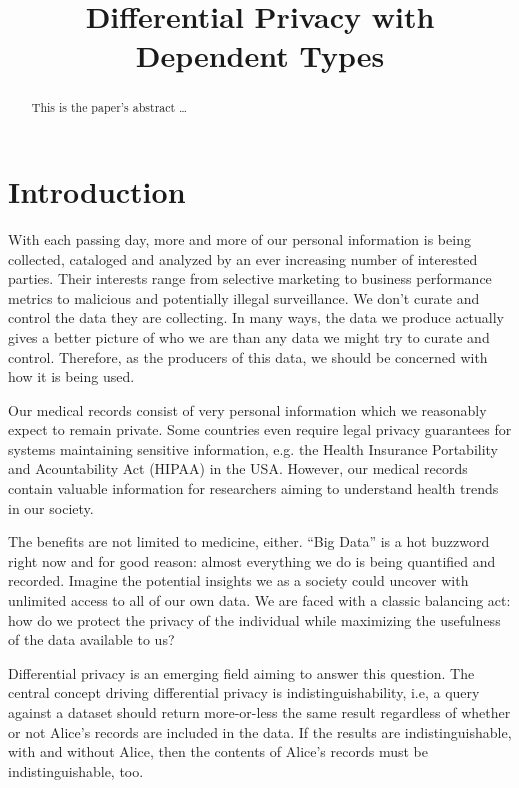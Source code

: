 \documentclass[12pt]{article}
\title{Differential Privacy with Dependent Types}
\begin{document}
\maketitle


\begin{abstract}
This is the paper's abstract \ldots
\end{abstract}


\section{Introduction}\label{sec:introduction}

With each passing day, more and more of our personal information is being collected, cataloged and analyzed by an ever increasing number of interested parties.
Their interests range from selective marketing to business performance metrics to malicious and potentially illegal surveillance.
We don't curate and control the data they are collecting.
In many ways, the data we produce actually gives a better picture of who we are than any data we might try to curate and control.
Therefore, as the producers of this data, we should be concerned with how it is being used.

Our medical records consist of very personal information which we reasonably expect to remain private.
Some countries even require legal privacy guarantees for systems maintaining sensitive information, e.g. the Health Insurance Portability and Acountability Act (HIPAA) in the USA.
However, our medical records contain valuable information for researchers aiming to understand health trends in our society.

The benefits are not limited to medicine, either.
``Big Data'' is a hot buzzword right now and for good reason: almost everything we do is being quantified and recorded.
Imagine the potential insights we as a society could uncover with unlimited access to all of our own data.
We are faced with a classic balancing act: how do we protect the privacy of the individual while maximizing the usefulness of the data available to us?

Differential privacy\cite{journals/cacm/Dwork11} is an emerging field aiming to answer this question.
The central concept driving differential privacy is indistinguishability, i.e, a query against a dataset should return more-or-less the same result regardless of whether or not Alice's records are included in the data.
If the results are indistinguishable, with and without Alice, then the contents of Alice's records must be indistinguishable, too.
\end{document}
